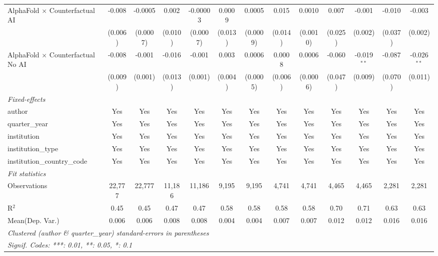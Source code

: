 \begin{tabular}{lcccccccccccc}
   AlphaFold $\times$ Counterfactual AI     & -0.008  & -0.0005  & 0.002   & -0.00003 & 0.0009  & 0.0005   & 0.015   & 0.0010   & 0.007   & -0.001        & -0.010  & -0.003\\   
                                            & (0.006) & (0.0007) & (0.010) & (0.0007) & (0.013) & (0.0009) & (0.014) & (0.0010) & (0.025) & (0.002)       & (0.037) & (0.002)\\   
   AlphaFold $\times$ Counterfactual No AI  & -0.008  & -0.001   & -0.016  & -0.001   & 0.003   & 0.0006   & 0.0008  & 0.0006   & -0.060  & -0.019$^{**}$ & -0.087  & -0.026$^{**}$\\   
                                            & (0.009) & (0.001)  & (0.013) & (0.001)  & (0.004) & (0.0005) & (0.006) & (0.0006) & (0.047) & (0.009)       & (0.070) & (0.011)\\   
   \midrule
   \emph{Fixed-effects}\\
   author                                   & Yes     & Yes      & Yes     & Yes      & Yes     & Yes      & Yes     & Yes      & Yes     & Yes           & Yes     & Yes\\  
   quarter\_year                            & Yes     & Yes      & Yes     & Yes      & Yes     & Yes      & Yes     & Yes      & Yes     & Yes           & Yes     & Yes\\  
   institution                              & Yes     & Yes      & Yes     & Yes      & Yes     & Yes      & Yes     & Yes      & Yes     & Yes           & Yes     & Yes\\  
   institution\_type                        & Yes     & Yes      & Yes     & Yes      & Yes     & Yes      & Yes     & Yes      & Yes     & Yes           & Yes     & Yes\\  
   institution\_country\_code               & Yes     & Yes      & Yes     & Yes      & Yes     & Yes      & Yes     & Yes      & Yes     & Yes           & Yes     & Yes\\  
   \midrule
   \emph{Fit statistics}\\
   Observations                             & 22,777  & 22,777   & 11,186  & 11,186   & 9,195   & 9,195    & 4,741   & 4,741    & 4,465   & 4,465         & 2,281   & 2,281\\  
   R$^2$                                    & 0.45    & 0.45     & 0.47    & 0.47     & 0.58    & 0.58     & 0.58    & 0.58     & 0.70    & 0.71          & 0.63    & 0.63\\  
Mean(Dep. Var.) & 0.006 & 0.006 & 0.008 & 0.008 & 0.004 & 0.004 & 0.007 & 0.007 & 0.012 & 0.012 & 0.016 & 0.016 \\
   \midrule \midrule
   \multicolumn{13}{l}{\emph{Clustered (author \& quarter\_year) standard-errors in parentheses}}\\
   \multicolumn{13}{l}{\emph{Signif. Codes: ***: 0.01, **: 0.05, *: 0.1}}\\
\end{tabular}
\par\endgroup
